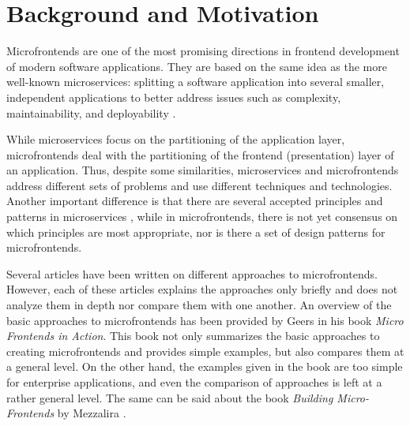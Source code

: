 \section{Background and Motivation}
Microfrontends are one of the most promising directions in frontend development of modern software applications. They are based on the same idea as the more well-known microservices: splitting a software application into several smaller, independent applications to better address issues such as complexity, maintainability, and deployability \cite{MezzaliraBuildingMf, Geers, Pavlenko}.

While microservices focus on the partitioning of the application layer, microfrontends deal with the partitioning of the frontend (presentation) layer of an application. Thus, despite some similarities, microservices and microfrontends address different sets of problems and use different techniques and technologies. Another important difference is that there are several accepted principles and patterns in microservices \cite{RichardsonPatterns, NewmanBuildingMs}, while in microfrontends, there is not yet consensus on which principles are most appropriate, nor is there a set of design patterns for microfrontends.

Several articles \cite{Pavlenko, Peltonen, Montelius, Jackson} have been written on different approaches to microfrontends. However, each of these articles explains the approaches only briefly and does not analyze them in depth nor compare them with one another. An overview of the basic approaches to microfrontends has been provided by Geers \cite{Geers} in his book \emph{Micro Frontends in Action}. This book not only summarizes the basic approaches to creating microfrontends and provides simple examples, but also compares them at a general level. On the other hand, the examples given in the book are too simple for enterprise applications, and even the comparison of approaches is left at a rather general level. The same can be said about the book \emph{Building Micro-Frontends} by Mezzalira \cite{MezzaliraBuildingMf}.